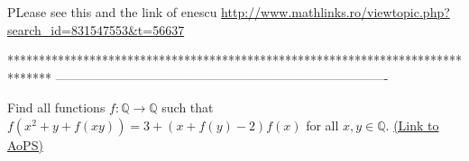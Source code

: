 \begin{mysolution}
	PLease see this and the link of enescu \url{http://www.mathlinks.ro/viewtopic.php?search_id=831547553&t=56637}
\end{mysolution}
*******************************************************************************
-------------------------------------------------------------------------------

\begin{problem}
	Find all functions $f: \mathbb Q \to \mathbb Q$  such that $ f(x^{2}+y+f(xy)) = 3+(x+f(y)-2)f(x)$ for all $x,y \in \mathbb Q$.
	\flushright \href{https://artofproblemsolving.com/community/c6h167309}{(Link to AoPS)}
\end{problem}



